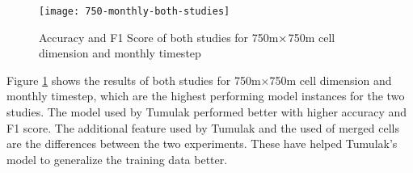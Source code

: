   \begin{figure}[H]
      \centering
      \texttt{[image: 750-monthly-both-studies]}
      \caption{Accuracy and F1 Score of both studies for 750m$\protect\times$750m cell dimension and monthly timestep}
      \label{750-monthly-both-studies}
    \end{figure}

    Figure \ref{750-monthly-both-studies} shows the results of both studies for 750m\(\times\)750m cell dimension and monthly timestep, which are the highest performing model instances for the two studies. The model used by Tumulak performed better with higher accuracy and F1 score. The additional feature used by Tumulak and the used of merged cells are the differences between the two experiments. These have helped Tumulak's model to generalize the training data better.
